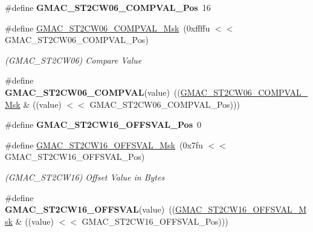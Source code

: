 \begin{DoxyCompactItemize}
\item 
\mbox{\label{group__SAMV71__GMAC_gae37aa2072d6d05e07714e3b4799b5529}} 
\#define {\bfseries G\+M\+A\+C\+\_\+\+S\+T2\+C\+W06\+\_\+\+C\+O\+M\+P\+V\+A\+L\+\_\+\+Pos}~16
\item 
\mbox{\label{group__SAMV71__GMAC_ga258850fddaf8cab9ebde0a4212f28811}} 
\#define \mbox{\hyperlink{group__SAMV71__GMAC_ga258850fddaf8cab9ebde0a4212f28811}{G\+M\+A\+C\+\_\+\+S\+T2\+C\+W06\+\_\+\+C\+O\+M\+P\+V\+A\+L\+\_\+\+Msk}}~(0xffffu $<$$<$ G\+M\+A\+C\+\_\+\+S\+T2\+C\+W06\+\_\+\+C\+O\+M\+P\+V\+A\+L\+\_\+\+Pos)
\begin{DoxyCompactList}\small\item\em (G\+M\+A\+C\+\_\+\+S\+T2\+C\+W06) Compare Value \end{DoxyCompactList}\item 
\mbox{\label{group__SAMV71__GMAC_ga0f2009166404e3e114401d2dcf7fe086}} 
\#define {\bfseries G\+M\+A\+C\+\_\+\+S\+T2\+C\+W06\+\_\+\+C\+O\+M\+P\+V\+AL}(value)~((\mbox{\hyperlink{group__SAMV71__GMAC_ga258850fddaf8cab9ebde0a4212f28811}{G\+M\+A\+C\+\_\+\+S\+T2\+C\+W06\+\_\+\+C\+O\+M\+P\+V\+A\+L\+\_\+\+Msk}} \& ((value) $<$$<$ G\+M\+A\+C\+\_\+\+S\+T2\+C\+W06\+\_\+\+C\+O\+M\+P\+V\+A\+L\+\_\+\+Pos)))
\item 
\mbox{\label{group__SAMV71__GMAC_ga21aafac15e41eb177f84b26e53935d90}} 
\#define {\bfseries G\+M\+A\+C\+\_\+\+S\+T2\+C\+W16\+\_\+\+O\+F\+F\+S\+V\+A\+L\+\_\+\+Pos}~0
\item 
\mbox{\label{group__SAMV71__GMAC_ga8bc12c0a6e710b9b77d1e9c964417dd1}} 
\#define \mbox{\hyperlink{group__SAMV71__GMAC_ga8bc12c0a6e710b9b77d1e9c964417dd1}{G\+M\+A\+C\+\_\+\+S\+T2\+C\+W16\+\_\+\+O\+F\+F\+S\+V\+A\+L\+\_\+\+Msk}}~(0x7fu $<$$<$ G\+M\+A\+C\+\_\+\+S\+T2\+C\+W16\+\_\+\+O\+F\+F\+S\+V\+A\+L\+\_\+\+Pos)
\begin{DoxyCompactList}\small\item\em (G\+M\+A\+C\+\_\+\+S\+T2\+C\+W16) Offset Value in Bytes \end{DoxyCompactList}\item 
\mbox{\label{group__SAMV71__GMAC_ga7901995a5d56f8db8c8522173dc041a8}} 
\#define {\bfseries G\+M\+A\+C\+\_\+\+S\+T2\+C\+W16\+\_\+\+O\+F\+F\+S\+V\+AL}(value)~((\mbox{\hyperlink{group__SAMV71__GMAC_ga8bc12c0a6e710b9b77d1e9c964417dd1}{G\+M\+A\+C\+\_\+\+S\+T2\+C\+W16\+\_\+\+O\+F\+F\+S\+V\+A\+L\+\_\+\+Msk}} \& ((value) $<$$<$ G\+M\+A\+C\+\_\+\+S\+T2\+C\+W16\+\_\+\+O\+F\+F\+S\+V\+A\+L\+\_\+\+Pos)))

\end{DoxyCompactItemize}
